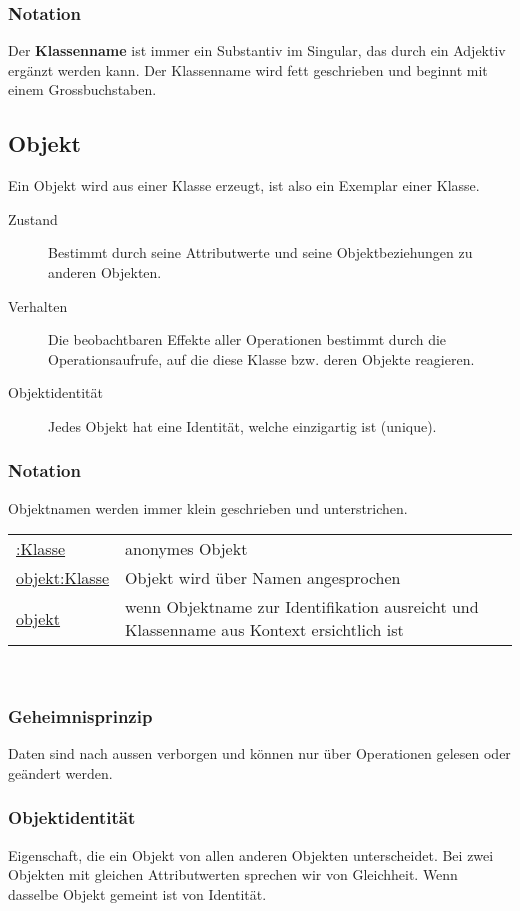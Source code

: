   \subsubsection{Notation}
  		Der \textbf{Klassenname} ist immer ein Substantiv im Singular, das durch ein Adjektiv
  		ergänzt werden kann. Der Klassenname wird fett geschrieben und beginnt mit einem
  		Grossbuchstaben. \\
  
\subsection{Objekt }
	Ein Objekt wird aus einer Klasse erzeugt, ist also ein Exemplar einer Klasse.
	\begin{description}
		\item[Zustand] 
      Bestimmt durch seine Attributwerte und seine Objektbeziehungen zu anderen Objekten.
		\item[Verhalten] 
      Die beobachtbaren Effekte aller Operationen bestimmt durch die Operationsaufrufe, 
      auf die diese Klasse bzw. deren Objekte reagieren.
		\item[Objektidentität] 
      Jedes Objekt hat eine Identität, welche einzigartig ist (unique).
	\end{description}
	
	\subsubsection{Notation}
			Objektnamen werden immer klein geschrieben und unterstrichen. \\
		\begin{tabular}{l l}
			\underline{:Klasse} & anonymes Objekt \\
			\underline{objekt:Klasse} & Objekt wird über Namen angesprochen \\
			\underline{objekt} & wenn Objektname zur Identifikation ausreicht und Klassenname aus Kontext ersichtlich ist \\
		\end{tabular}\\
		
	\begin{multicols}{2}	
		\subsubsection{Geheimnisprinzip}
		Daten sind nach aussen verborgen und können nur über Operationen gelesen oder geändert werden.\\
		\vfill\null
		\columnbreak
		\subsubsection{Objektidentität}
		Eigenschaft, die ein Objekt von allen anderen Objekten unterscheidet. Bei zwei Objekten
		mit gleichen Attributwerten sprechen wir von Gleichheit. Wenn dasselbe Objekt gemeint ist von Identität.
	\end{multicols}
	
